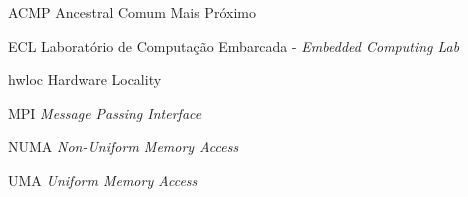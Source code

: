 \listoffigures*
\cleardoublepage
\listoftables*
\cleardoublepage
\begin{siglas}
	\item[ACMP] Ancestral Comum Mais Próximo
	\item[ECL]  Laboratório de Computação Embarcada - \textit{Embedded Computing Lab}
	\item[hwloc] Hardware Locality
	\item[MPI]  \textit{Message Passing Interface}
	\item[NUMA] \textit{Non-Uniform Memory Access}
	\item[UMA]  \textit{Uniform Memory Access}
\end{siglas}

\tableofcontents*
\cleardoublepage
